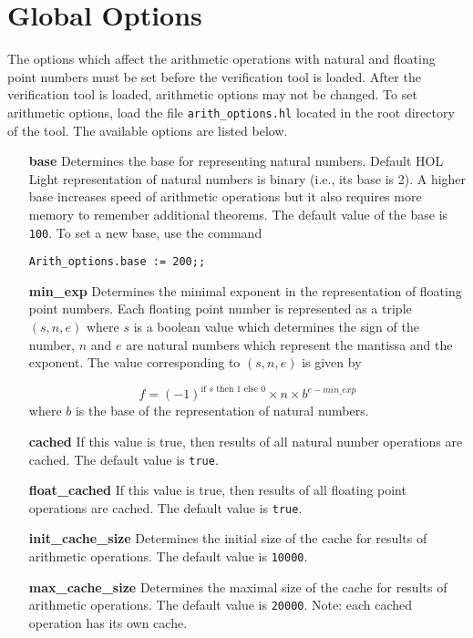 \documentclass[a4paper]{article}
\begin{document}
\section{Global Options}\label{global}
The options which affect the arithmetic operations with natural and floating point numbers must be set before the verification tool is loaded. After the verification tool is loaded, arithmetic options may not be changed. To set arithmetic options, load the file \verb|arith_options.hl| located in the root directory of the tool. The available options are listed below.

\begin{enumerate}
\item[\bf base] Determines the base for representing natural numbers. Default HOL Light 
representation of natural numbers is binary (i.e., its base is 2). A higher base increases speed of arithmetic operations but it also requires more memory to remember additional theorems. The default value of the base is \verb|100|. To set a new base, use the command

\verb|Arith_options.base := 200;;|

\item[\bf min\_exp] Determines the minimal exponent in the representation of floating point numbers. Each floating point number is represented as a triple $(s, n, e)$ where $s$ is a boolean value which determines the sign of the number, $n$ and $e$ are natural numbers which represent the mantissa and the exponent. The value corresponding to $(s, n, e)$ is given by

\[f = (-1)^{\text{if $s$ then $1$ else $0$}} \times n \times b^{e - min\_exp}\]
where $b$ is the base of the representation of natural numbers.

\item[\bf cached] If this value is true, then results of all natural number operations are cached. The default value is \verb|true|.

\item[\bf float\_cached] If this value is true, then results of all floating point operations are cached. The default value is \verb|true|.

\item[\bf init\_cache\_size] Determines the initial size of the cache for results of arithmetic operations. The default value is \verb|10000|.

\item[\bf max\_cache\_size] Determines the maximal size of the cache for results of arithmetic operations. The default value is \verb|20000|. Note: each cached operation has its own cache.

\end{enumerate}
\end{document}
